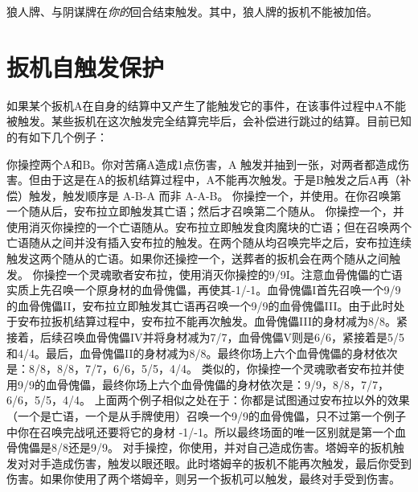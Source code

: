 狼人牌、与阴谋牌在\emph{你的}回合结束触发。其中，狼人牌的扳机不能被加倍。

\section{扳机自触发保护}
\label{self-triggering-protection}

如果某个扳机A在自身的结算中又产生了能触发它的事件，在该事件过程中A不能被触发。某些扳机在这次触发完全结算完毕后，会补偿进行跳过的结算。目前已知的有如下几个例子：

\example 你操控两个A和B。你对苦痛A造成1点伤害，A 触发并抽到一张，对两者都造成伤害。但由于这是在A的扳机结算过程中，A不能再次触发。于是B触发之后A再（补偿）触发，触发顺序是 A-B-A 而非 A-A-B。
\example 你操控一个，并使用。在你召唤第一个随从后，安布拉立即触发其亡语；然后才召唤第二个随从。
\example 你操控一个，并使用消灭你操控的一个亡语随从。安布拉立即触发食肉魔块的亡语；但在召唤两个亡语随从之间并没有插入安布拉的触发。在两个随从均召唤完毕之后，安布拉连续触发这两个随从的亡语。如果你还操控一个，送葬者的扳机会在两个随从之间触发。
\example 你操控一个灵魂歌者安布拉，使用消灭你操控的9/9I。注意血骨傀儡的亡语实质上先召唤一个原身材的血骨傀儡，再使其-1/-1。血骨傀儡I首先召唤一个9/9的血骨傀儡II，安布拉立即触发其亡语再召唤一个9/9的血骨傀儡III。由于此时处于安布拉扳机结算过程中，安布拉不能再次触发。血骨傀儡III的身材减为8/8。紧接着，后续召唤血骨傀儡IV并将身材减为7/7，血骨傀儡V则是6/6，紧接着是5/5和4/4。最后，血骨傀儡II的身材减为8/8。最终你场上六个血骨傀儡的身材依次是：8/8，8/8，7/7，6/6，5/5，4/4。
\example 类似的，你操控一个灵魂歌者安布拉并使用9/9的血骨傀儡，最终你场上六个血骨傀儡的身材依次是：9/9，8/8，7/7，6/6，5/5，4/4。
\notice 上面两个例子相似之处在于：你都是试图通过安布拉以外的效果（一个是亡语，一个是从手牌使用）召唤一个9/9的血骨傀儡，只不过第一个例子中你在召唤完战吼还要将它的身材 -1/-1。所以最终场面的唯一区别就是第一个血骨傀儡是8/8还是9/9。
\example 对手操控，你使用，并对自己造成伤害。塔姆辛的扳机触发对对手造成伤害，触发以眼还眼。此时塔姆辛的扳机不能再次触发，最后你受到伤害。如果你使用了两个塔姆辛，则另一个扳机可以触发，最终对手受到伤害。

